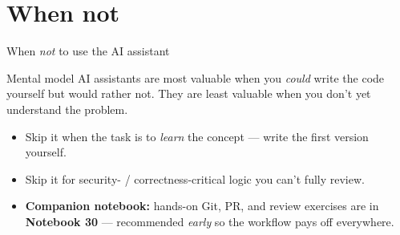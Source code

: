 \documentclass[aspectratio=169,11pt]{beamer}
\begin{document}
\section{When not}
\begin{frame}{When \emph{not} to use the AI assistant}
  \begin{exampleblock}{Mental model}
    AI assistants are most valuable when you \emph{could} write the code yourself but would rather not. They are least valuable when you don't yet understand the problem.
  \end{exampleblock}
  \begin{itemize}
    \item Skip it when the task is to \emph{learn} the concept --- write the first version yourself.
    \item Skip it for security- / correctness-critical logic you can't fully review.
    \item \textbf{Companion notebook:} hands-on Git, PR, and review exercises are in \textbf{Notebook 30} --- recommended \emph{early} so the workflow pays off everywhere.
  \end{itemize}
\end{frame}
\end{document}
